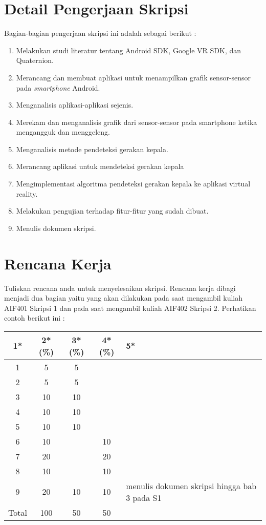\documentclass[a4paper,twoside]{article}
\begin{document}
\section{Detail Pengerjaan Skripsi}

Bagian-bagian pengerjaan skripsi ini adalah sebagai berikut :
	\begin{enumerate}
		\item Melakukan studi literatur tentang Android SDK, Google VR SDK, dan Quaternion.
		\item Merancang dan membuat aplikasi untuk menampilkan grafik sensor-sensor pada \textit{smartphone} Android.
		\item Menganalisis aplikasi-aplikasi sejenis.
		\item Merekam dan menganalisis grafik dari sensor-sensor pada smartphone ketika mengangguk dan menggeleng.
		\item Menganalisis metode pendeteksi gerakan kepala.
		\item Merancang aplikasi untuk mendeteksi gerakan kepala
		\item Mengimplementasi algoritma pendeteksi gerakan kepala ke aplikasi virtual reality.
		\item Melakukan pengujian terhadap fitur-fitur yang sudah dibuat.
		\item Menulis dokumen skripsi.

	\end{enumerate}
\section{Rencana Kerja}
Tuliskan rencana anda untuk menyelesaikan skripsi. Rencana kerja dibagi menjadi dua bagian yaitu yang akan dilakukan pada saat mengambil kuliah AIF401 Skripsi 1 dan pada saat mengambil kuliah AIF402 Skripsi 2. Perhatikan contoh berikut ini :


\begin{center}
  \begin{tabular}{ | c | c | c | c | l |}
    \hline
    1*  & 2*(\%) & 3*(\%) & 4*(\%) &5*\\ \hline \hline
    1   & 5  & 5  &  &  \\ \hline
    2   & 5 & 5  &   & \\ \hline
    3   & 10  & 10  &  & \\ \hline
    4   & 10  & 10  &  & \\ \hline
    5   & 10  & 10  &  & \\ \hline
    6   & 10 &   & 10  & \\ \hline
    7   & 20  &   & 20 & \\ \hline
    8   & 10  &   &  10  & \\ \hline
    9   & 20  & 10  & 10  & {\footnotesize menulis dokumen skripsi hingga bab 3 pada S1}\\ \hline
    Total  & 100  & 50  & 50 &  \\ \hline
                          \end{tabular}
\end{center}
\end{document}
